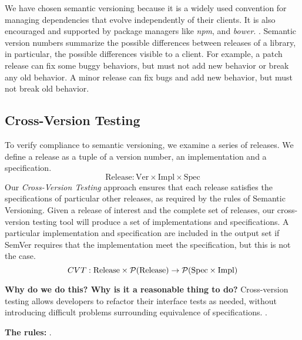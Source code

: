 We have chosen semantic versioning because it is a widely used
convention for managing dependencies that evolve independently of
their clients.
%
It is also encouraged and supported by package managers like
\emph{npm}, and \emph{bower}.
%
.
%
Semantic version numbers summarize the possible differences between
releases of a library, in particular, the possible differences visible
to a client. For example, a patch release can fix some buggy
behaviors, but must not add new behavior or break any old behavior. A
minor release can fix bugs and add new behavior, but must not break
old behavior.

\subsection{Cross-Version Testing} \label{sec:cvt}
To verify compliance to semantic versioning, we examine a series of
releases.
%
We define a release as a tuple of a version number, an implementation
and a specification.
$$ \text{Release} : \text{Ver} \times \text{Impl} \times \text{Spec} $$
%
Our \emph{Cross-Version Testing} approach ensures that each release
satisfies the specifications of particular other releases, as required
by the rules of Semantic Versioning. Given a release of interest and
the complete set of releases, our cross-version testing tool will
produce a set of implementations and specifications. A particular
implementation and specification are included in the output set if
SemVer requires that the implementation meet the specification, but
this is not the case.
$$
CVT : \text{Release} \times \mathcal{P}(\text{Release}) \to \mathcal{P}(\text{Spec} \times \text{Impl})
$$

{\bf Why do we do this? Why is it a reasonable thing to do?}
Cross-version testing allows developers to refactor their interface
tests as needed, without introducing difficult problems surrounding
equivalence of specifications. .

{\bf The rules:} .

